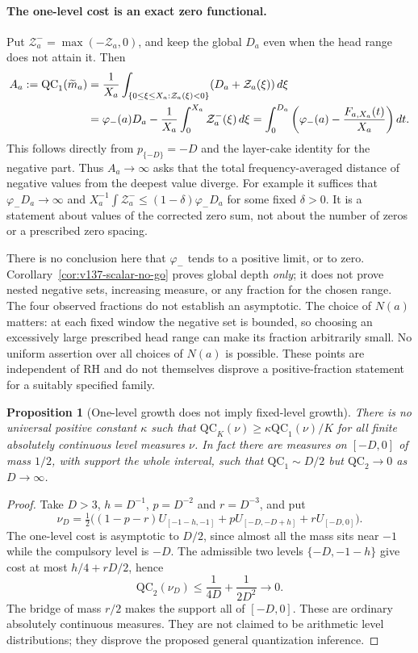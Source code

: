 \documentclass[11pt]{article}
\newtheorem{proposition}[theorem]{Proposition}
\theoremstyle{remark}
\begin{document}
\paragraph{The one-level cost is an exact zero functional.}
Put $\mathcal Z_a^-=\max(-\mathcal Z_a,0)$, and keep the global
$D_a$ even when the head range does not attain it. Then
\begin{align}
 A_a:=\mathrm{QC}_1(\widetilde m_a)
 &=\frac1{X_a}\int_{\{0\le\xi\le X_a:\mathcal Z_a(\xi)<0\}}
                         (D_a+\mathcal Z_a(\xi))\,d\xi \notag\\
 &=\varphi_-(a)D_a-\frac1{X_a}\int_0^{X_a}\mathcal Z_a^-(\xi)\,d\xi
 =\int_0^{D_a}\left(\varphi_-(a)-\frac{F_{a,X_a}(t)}{X_a}\right)dt.
 \label{eq:v149-qc1-zero}
\end{align}
This follows directly from $p_{\{-D\}}=-D$ and the layer-cake identity
for the negative part. Thus $A_a\to\infty$ asks that the total
frequency-averaged distance of negative values from the deepest
value diverge. For example it suffices that
$\varphi_-D_a\to\infty$ and
$X_a^{-1}\int\mathcal Z_a^-\le(1-\delta)\varphi_-D_a$ for some fixed
$\delta>0$. It is a statement about values of the corrected zero sum,
not about the number of zeros or a prescribed zero spacing.

There is no conclusion here that $\varphi_-$ tends to a positive limit,
or to zero. Corollary~\ref{cor:v137-scalar-no-go} proves global depth
\emph{only}; it does not prove nested negative sets, increasing measure,
or any fraction for the chosen range. The four observed fractions do
not establish an asymptotic. The choice of $N(a)$ matters: at each fixed
window the negative set is bounded, so choosing an excessively large
prescribed head range can make its fraction arbitrarily small. No
uniform assertion over all choices of $N(a)$ is possible. These points
are independent of RH and do not themselves disprove a positive-fraction
statement for a suitably specified family.

\begin{proposition}[One-level growth does not imply fixed-level growth]
\label{prop:v149-qc1-insufficient}
There is no universal positive constant $\kappa$ such that
$\mathrm{QC}_K(\nu)\ge\kappa\mathrm{QC}_1(\nu)/K$ for all finite
absolutely continuous level measures $\nu$. In fact there are measures
on $[-D,0]$ of mass $1/2$, with support the whole interval, such that
$\mathrm{QC}_1\sim D/2$ but $\mathrm{QC}_2\to0$ as $D\to\infty$.
\end{proposition}
\begin{proof}
Take $D>3$, $h=D^{-1}$, $p=D^{-2}$ and $r=D^{-3}$, and put
\[
 \nu_D=\tfrac12\bigl((1-p-r)U_{[-1-h,-1]}
             +pU_{[-D,-D+h]}+rU_{[-D,0]}\bigr).
\]
The one-level cost is asymptotic to $D/2$, since almost all the mass
sits near $-1$ while the compulsory level is $-D$. The admissible two
levels $\{-D,-1-h\}$ give cost at most $h/4+rD/2$, hence
\[
 \mathrm{QC}_2(\nu_D)\le\frac1{4D}+\frac1{2D^2}\longrightarrow0.
\]
The bridge of mass $r/2$ makes the support all of $[-D,0]$. These are
ordinary absolutely continuous measures. They are not claimed to be
arithmetic level distributions; they disprove the proposed general
quantization inference.
\end{proof}
\end{document}
